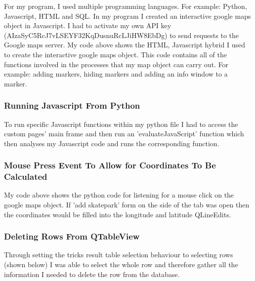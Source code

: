 For my program, I used multiple programming languages. For example: Python, Javascript, HTML and SQL. In my program I created an interactive google maps object in Javascript. I had to activate my own API key (AIzaSyC5RcJ7vLSEYF32KqDusnuRcLJiHW8EbDg) to send requests to the Google maps server. My code above shows the HTML, Javascript hybrid I used to create the interactive google maps object. This code contains all of the functions involved in the processes that my map object can carry out. For example: adding markers, hiding markers and adding an info window to a marker.



\subsubsection{Running Javascript From Python}

To run specific Javascript functions within my python file I had to access the custom pages' main frame and then run an 'evaluateJavaScript' function which then analyses my Javascript code and runs the corresponding function.


\subsubsection{Mouse Press Event To Allow for Coordinates To Be Calculated}

My code above shows the python code for listening for a mouse click on the google maps object. If 'add skatepark' form on the side of the tab was open then the coordinates would be filled into the longitude and latitude QLineEdits. 



\subsubsection{Deleting Rows From QTableView}

Through setting the tricks result table selection behaviour to selecting rows (shown below) 
I was able to select the whole row and therefore gather all the information I needed to delete the row from the database.


